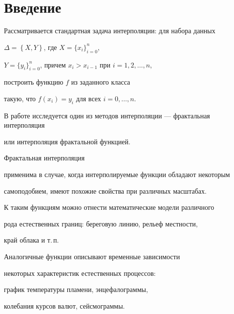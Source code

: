 

\pagestyle{plain} %







\maketitle


\label{begin}





\section{Введение} \label{intro}





Рассматривается стандартная задача интерполяции: для набора данных


$\Delta =\left\{X,Y\right\}$, где $X=\{x_i\}^{n}_{i=0}$,


$Y=\{y_i\}^{n}_{i=0}$, причем $x_i>x_{i-1}$ при $i=1,2,\dotsc,n $,


построить функцию $f$ из заданного класса


такую, что $f(x_i)=y_i$ для всех $i=0,\dotsc,n$.


В работе исследуется один из методов интерполяции --- фрактальная интерполяция


или интерполяция фрактальной функцией.


Фрактальная интерполяция


применима в случае, когда интерполируемые функции обладают некоторым


самоподобием, имеют похожие свойства при различных масштабах.


К таким функциям можно отнести математические модели различного


рода естественных границ: береговую линию, рельеф местности,


край облака и т.\,п.


Аналогичные функции описывают временные зависимости


некоторых характеристик естественных процессов:


график температуры пламени, энцефалограммы,


колебания курсов валют, сейсмограммы.



